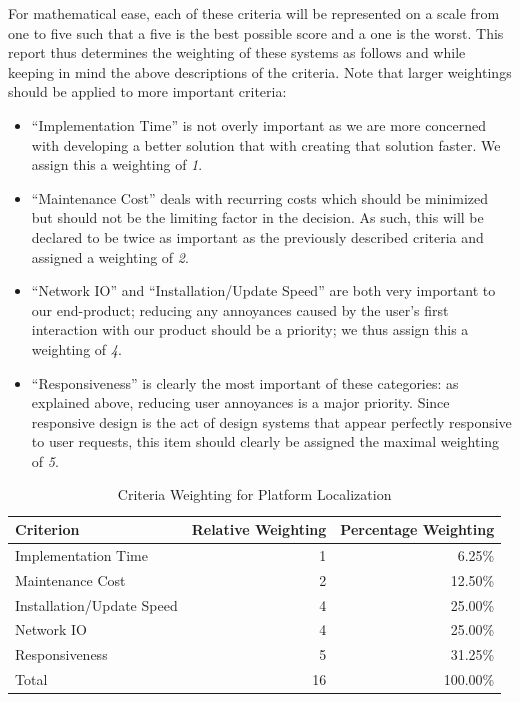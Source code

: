 \documentclass[12pt]{article}
\begin{document}
For mathematical ease, each of these criteria will be represented on a scale from one to five such that a five is the best possible score and a one is the worst. This report thus determines the weighting of these systems as follows and while keeping in mind the above descriptions of the criteria. Note that larger weightings should be applied to more important criteria:
\begin{itemize}
\item ``Implementation Time'' is not overly important as we are more concerned with developing a better solution that with creating that solution faster. We assign this a weighting of {\it 1}.
\item ``Maintenance Cost'' deals with recurring costs which should be minimized but should not be the limiting factor in the decision. As such, this will be declared to be twice as important as the previously described criteria and assigned a weighting of {\it 2}.
\item ``Network IO'' and ``Installation/Update Speed'' are both very important to our end-product; reducing any annoyances caused by the user's first interaction with our product should be a priority; we thus assign this a weighting of {\it 4}.
\item ``Responsiveness'' is clearly the most important of these categories: as explained above, reducing user annoyances is a major priority. Since responsive design is the act of design systems that appear perfectly responsive to user requests, this item should clearly be assigned the maximal weighting of {\it 5}.
\end{itemize}

\begin{table}[ht]
\caption{Criteria Weighting for Platform Localization}
\label{tbl:weighting-pltfrmlclztn}
\centering
\begin{tabular}{|l|r|r|}
    \hline
    Criterion & Relative Weighting & Percentage Weighting \\
    \hline
    \hline
    Implementation Time       &  1 &   6.25\% \\
    Maintenance Cost          &  2 &  12.50\% \\
    Installation/Update Speed &  4 &  25.00\% \\
    Network IO                &  4 &  25.00\% \\
    Responsiveness            &  5 &  31.25\% \\
    \hline
    \hline
    Total                     & 16 & 100.00\% \\
    \hline
\end{tabular}
\end{table}
\end{document}
